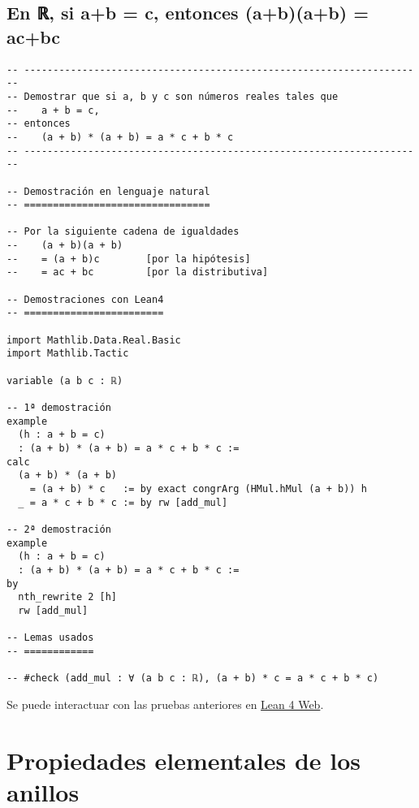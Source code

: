 \section{En ℝ, si a+b = c, entonces (a+b)(a+b) = ac+bc}
\label{sec:orgfb7408b}
\begin{verbatim}
-- ---------------------------------------------------------------------
-- Demostrar que si a, b y c son números reales tales que
--    a + b = c,
-- entonces
--    (a + b) * (a + b) = a * c + b * c
-- ---------------------------------------------------------------------

-- Demostración en lenguaje natural
-- ================================

-- Por la siguiente cadena de igualdades
--    (a + b)(a + b)
--    = (a + b)c        [por la hipótesis]
--    = ac + bc         [por la distributiva]

-- Demostraciones con Lean4
-- ========================

import Mathlib.Data.Real.Basic
import Mathlib.Tactic

variable (a b c : ℝ)

-- 1ª demostración
example
  (h : a + b = c)
  : (a + b) * (a + b) = a * c + b * c :=
calc
  (a + b) * (a + b)
    = (a + b) * c   := by exact congrArg (HMul.hMul (a + b)) h
  _ = a * c + b * c := by rw [add_mul]

-- 2ª demostración
example
  (h : a + b = c)
  : (a + b) * (a + b) = a * c + b * c :=
by
  nth_rewrite 2 [h]
  rw [add_mul]

-- Lemas usados
-- ============

-- #check (add_mul : ∀ (a b c : ℝ), (a + b) * c = a * c + b * c)
\end{verbatim}
Se puede interactuar con las pruebas anteriores en \href{https://lean.math.hhu.de/\#url=https://raw.githubusercontent.com/jaalonso/Calculemus2/main/src/Sia+b\_eq\_c\_entonces\_(a+b)(a+b)\_eq\_ac+bc.lean}{Lean 4 Web}.

\chapter{Propiedades elementales de los anillos}
\label{sec:org517e014}

